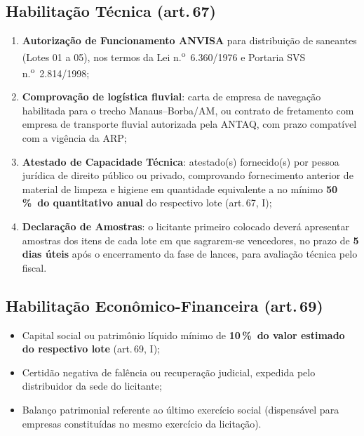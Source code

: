 \documentclass[12pt,a4paper]{article}
\newcommand{\art}[1]{art.\,#1}
\newcommand{\pct}{\%}
\begin{document}
\subsection{Habilitação Técnica (\art{67})}

\begin{enumerate}
  \item \textbf{Autorização de Funcionamento ANVISA} para distribuição de saneantes
    (Lotes 01 a 05), nos termos da Lei n.\textsuperscript{o}~6.360/1976 e Portaria
    SVS n.\textsuperscript{o}~2.814/1998;

  \item \textbf{Comprovação de logística fluvial}: carta de empresa de navegação
    habilitada para o trecho Manaus--Borba/AM, ou contrato de fretamento com empresa
    de transporte fluvial autorizada pela ANTAQ, com prazo compatível com a vigência
    da ARP;

  \item \textbf{Atestado de Capacidade Técnica}: atestado(s) fornecido(s) por pessoa
    jurídica de direito público ou privado, comprovando fornecimento anterior de
    material de limpeza e higiene em quantidade equivalente a no mínimo \textbf{50\,\pct\
    do quantitativo anual} do respectivo lote (\art{67}, I);

  \item \textbf{Declaração de Amostras}: o licitante primeiro colocado deverá
    apresentar amostras dos itens de cada lote em que sagrarem-se vencedores, no
    prazo de \textbf{5 dias úteis} após o encerramento da fase de lances, para
    avaliação técnica pelo fiscal.
\end{enumerate}

\subsection{Habilitação Econômico-Financeira (\art{69})}

\begin{itemize}
  \item Capital social ou patrimônio líquido mínimo de \textbf{10\,\pct\ do valor
    estimado do respectivo lote} (\art{69}, I);
  \item Certidão negativa de falência ou recuperação judicial, expedida pelo
    distribuidor da sede do licitante;
  \item Balanço patrimonial referente ao último exercício social (dispensável para
    empresas constituídas no mesmo exercício da licitação).
\end{itemize}
\end{document}
